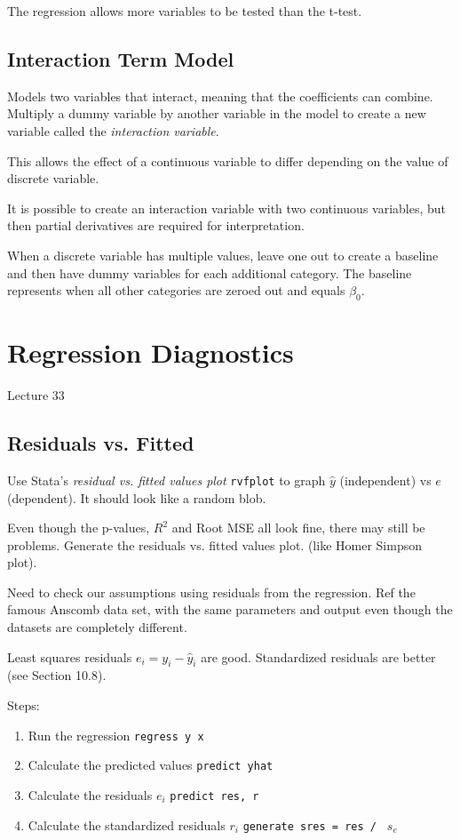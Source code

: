 \documentclass[11pt, oneside]{article}   	%
\begin{document}
The regression allows more variables to be tested than the t-test.

\subsection{Interaction Term Model}

Models two variables that interact, meaning that the coefficients can combine. Multiply a dummy variable by another variable in the model to create a new variable called the \textit{interaction variable}.

This allows the effect of a continuous variable to differ depending on the value of discrete variable.

It is possible to create an interaction variable with two continuous variables, but then partial derivatives are required for interpretation.

When a discrete variable has multiple values, leave one out to create a baseline and then have dummy variables for each additional category. The baseline represents when all other categories are zeroed out and equals $\beta_0$. 

\section{Regression Diagnostics}

Lecture 33

\subsection{Residuals vs. Fitted}

Use Stata's \textit{residual vs. fitted values plot} \texttt{rvfplot} to graph $\hat{y}$ (independent) vs $e$ (dependent). It should look like a random blob.

Even though the p-values, $R^2$ and Root MSE all look fine, there may still be problems. Generate the residuals vs. fitted values plot. (like Homer Simpson plot).

Need to check our assumptions using residuals from the regression. Ref the famous Anscomb data set, with the same parameters and output even though the datasets are completely different.

Least squares residuals $e_i = y_i - \hat{y}_i$ are good. Standardized residuals are better (see Section 10.8).

Steps:
\begin{enumerate}
\item{Run the regression \texttt{regress y x}}
\item{Calculate the predicted values \texttt{predict yhat}}
\item{Calculate the residuals $e_i$ \texttt{predict res, r}}
\item{Calculate the standardized residuals $r_i$ \texttt{generate sres = res / } $s_e$}
\end{enumerate}
\end{document}
